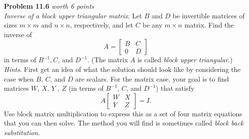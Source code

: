 \documentclass{article}
\newenvironment{problem}[3][Problem]
    { \begin{mdframed}[backgroundcolor=gray!20] \textbf{#1 #2} \textit{worth #3 points} \\}
    {  \end{mdframed}}
\begin{document}
\begin{problem}{11.6}{6}
\textit{Inverse of a block upper triangular matrix}. Let $B$ and $D$ be invertible matrices of sizes
$m\times m$ and $n\times n$, respectively, and let $C$ be any $m\times n$ matrix. Find the inverse of $$A = \begin{bmatrix} B & C \\ 0 & D \end{bmatrix}$$ in terms of $B^{-1}, C$, and $D^{-1}$. (The matrix $A$ is called \textit{block upper triangular}.) \\
\textit{Hints}. First get an idea of what the solution should look like by considering the case when $B$, $C$, and $D$ are scalars. For the matrix case, your goal is to find matrices $W$, $X$, $Y$ , $Z$ (in terms of $B^{-1}$, $C$, and $D^{-1}$) that satisfy $$A\begin{bmatrix} W & X \\ Y & Z \end{bmatrix} = I.$$ Use block matrix multiplication to express this as a set of four matrix equations that you can then solve. The method you will find is sometimes called \textit{block back substitution}.
\end{problem}
\end{document}
